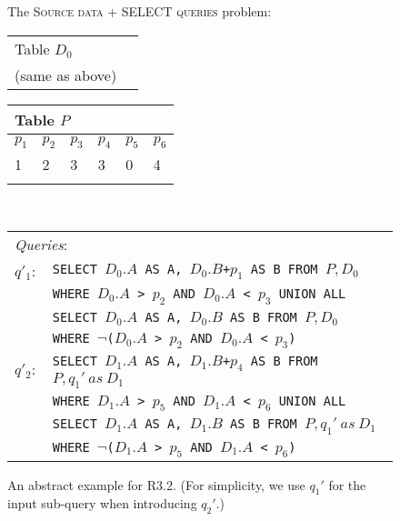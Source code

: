 \begin{figure}[t]
The \textsc{Source data + SELECT queries} problem: \\
\begin{minipage}[t]{0.1\textwidth}
         \vspace{0pt} 
         \centering
        \begin{tabular}{ll}
            \multicolumn{2}{l}{Table $D_0$}\\
            (same as above) \\
        \end{tabular}
    \end{minipage}
\begin{minipage}[t]{0.36\textwidth}
         \vspace{0pt} 
         \centering
        \begin{tabular}{llllll}
            \multicolumn{6}{l}{Table $P$}\\
            \toprule
            \textbf{$p_1$}  & \textbf{$p_2$} & \textbf{$p_3$} & \textbf{$p_4$}  & \textbf{$p_5$} & \textbf{$p_6$} \\
            \midrule
			 1 & 2 & 3 & 3 & 0 & 4\\
            \bottomrule
            \\
        \end{tabular}
    \end{minipage}\\
        \begin{minipage}[t]{0.22\textwidth}
         \vspace{0pt} 
         \centering
        \begin{tabular}{p{2ex}p{55ex}}
         \multicolumn{2}{l}{\emph{Queries}: }\\
        $q'_1$: &
        \texttt{\small SELECT $D_0.A$ AS A, $D_0.B$+$p_1$ AS B FROM $P, D_0$ } \\
        & \texttt{\small WHERE $D_0.A$ > $p_2$ AND $D_0.A$ < $p_3$ UNION ALL}\\
        & \texttt{\small SELECT $D_0.A$ AS A, $D_0.B$ AS B FROM $P, D_0$ }\\
        &\texttt{\small  WHERE $\neg$($D_0.A$ > $p_2$ AND $D_0.A$ < $p_3$)} \\
        $q'_2:$ &
         \texttt{\small SELECT $D_1.A$ AS A, $D_1.B$+$p_4$ AS B FROM $P, q_1'\ as\ D_1$ } \\
        & \texttt{\small WHERE $D_1.A$ > $p_5$ AND $D_1.A$ < $p_6$ UNION ALL}\\
        & \texttt{\small SELECT $D_1.A$ AS A, $D_1.B$ AS B FROM $P, q_1'\ as\ D_1$ }\\
        &\texttt{\small  WHERE $\neg$($D_1.A$ > $p_5$ AND $D_1.A$ < $p_6$)} \\
        \end{tabular}
    \end{minipage}
    \caption{An abstract example for R3.2. (For simplicity, we use $q_1'$ for the input sub-query when introducing $q_2'$.)}
\label{fig:example-cover}
\end{figure}

